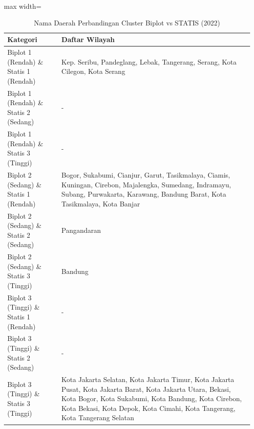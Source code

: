\begin{table}[H]
\centering
\caption{Nama Daerah Perbandingan Cluster Biplot vs STATIS (2022)} \label{tab:appbiplot_statis_comp_name_2022}
\begin{adjustbox}{max width=\textwidth}
\begin{tabular}{|p{4cm}|p{10cm}|}
\hline
\textbf{Kategori} & \textbf{Daftar Wilayah} \\
\hline
Biplot 1 (Rendah) \& Statis 1 (Rendah) & Kep. Seribu, Pandeglang, Lebak, Tangerang, Serang, Kota Cilegon, Kota Serang \\
\hline
Biplot 1 (Rendah) \& Statis 2 (Sedang) & - \\
\hline
Biplot 1 (Rendah) \& Statis 3 (Tinggi) & - \\
\hline
Biplot 2 (Sedang) \& Statis 1 (Rendah) & Bogor, Sukabumi, Cianjur, Garut, Tasikmalaya, Ciamis, Kuningan, Cirebon, Majalengka, Sumedang, Indramayu, Subang, Purwakarta, Karawang, Bandung Barat, Kota Tasikmalaya, Kota Banjar \\
\hline
Biplot 2 (Sedang) \& Statis 2 (Sedang) & Pangandaran \\
\hline
Biplot 2 (Sedang) \& Statis 3 (Tinggi) & Bandung \\
\hline
Biplot 3 (Tinggi) \& Statis 1 (Rendah) & - \\
\hline
Biplot 3 (Tinggi) \& Statis 2 (Sedang) & - \\
\hline
Biplot 3 (Tinggi) \& Statis 3 (Tinggi) & Kota Jakarta Selatan, Kota Jakarta Timur, Kota Jakarta Pusat, Kota Jakarta Barat, Kota Jakarta Utara, Bekasi, Kota Bogor, Kota Sukabumi, Kota Bandung, Kota Cirebon, Kota Bekasi, Kota Depok, Kota Cimahi, Kota Tangerang, Kota Tangerang Selatan \\
\hline
\end{tabular}
\end{adjustbox}
\end{table}